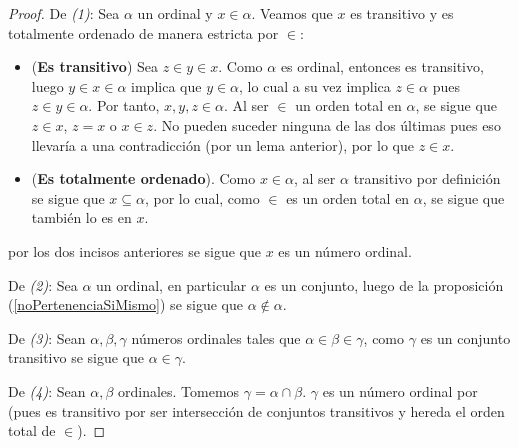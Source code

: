 \documentclass[12pt]{report}
\newcounter{it}
\theoremstyle{largebreak}
\begin{document}
    \begin{proof}
        De \textit{(1)}: Sea $\alpha$ un ordinal y $x\in\alpha$. Veamos que $x$ es transitivo y es totalmente ordenado de manera estricta por $\in$:
        \begin{itemize}
            \item (\textbf{Es transitivo}) Sea $z\in y\in x$. Como $\alpha$ es ordinal, entonces es transitivo, luego $y\in x\in\alpha$ implica que $y\in\alpha$, lo cual a su vez implica $z\in\alpha$ pues $z\in y\in\alpha$. Por tanto, $x,y,z\in\alpha$. Al ser $\in$ un orden total en $\alpha$, se sigue que $z\in x$, $z=x$ o $x\in z$. No pueden suceder ninguna de las dos últimas pues eso llevaría a una contradicción (por un lema anterior), por lo que $z\in x$.
            \item (\textbf{Es totalmente ordenado}). Como $x\in\alpha$, al ser $\alpha$ transitivo por definición se sigue que $x\subseteq\alpha$, por lo cual, como $\in$ es un orden total en $\alpha$, se sigue que también lo es en $x$.
        \end{itemize}
        por los dos incisos anteriores se sigue que $x$ es un número ordinal.

        De \textit{(2)}: Sea $\alpha$ un ordinal, en particular $\alpha$ es un conjunto, luego de la proposición (\ref{noPertenenciaSiMismo}) se sigue que $\alpha\notin\alpha$.

        De \textit{(3)}: Sean $\alpha,\beta,\gamma$ números ordinales tales que $\alpha\in\beta\in\gamma$, como $\gamma$ es un conjunto transitivo se sigue que $\alpha\in\gamma$.

        De \textit{(4)}: Sean $\alpha,\beta$ ordinales. Tomemos $\gamma=\alpha\cap\beta$. $\gamma$ es un número ordinal por (pues es transitivo por ser intersección de conjuntos transitivos y hereda el orden total de $\in$).


\end{proof}
\end{document}
